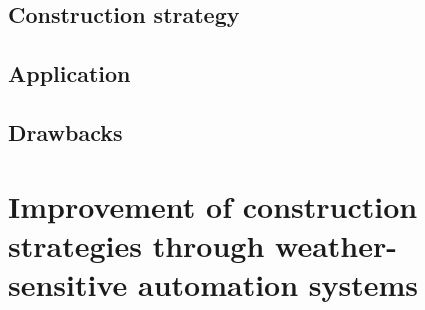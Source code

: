 \subsection{Construction strategy}

\subsection{Application}

\subsection{Drawbacks}

\section{Improvement of construction strategies through weather-sensitive automation systems}

